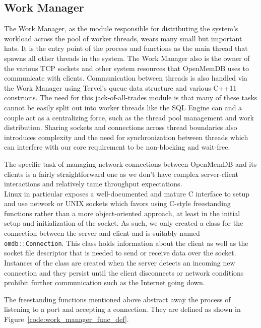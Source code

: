 \documentclass[letterpaper, 11pt]{article}
\newcommand{\inlinecode}[1]{\colorbox{codegrey}{\lstinline[language=C++]{#1}}}
\begin{document}
  \subsection{Work Manager}
  The Work Manager, as the module responsible for distributing the system's workload across the
  pool of worker threads, wears many small but important hats. It is the entry point of the
  process and functions as the main thread that spawns all other threads in the system. The Work
  Manager also is the owner of the various TCP sockets and other system resources that OpenMemDB
  uses to communicate with clients. Communication between threads is also handled via the
  Work Manager using Tervel's queue data structure and various C++11 constructs. The need for this
  jack-of-all-trades module is that many of these tasks cannot be easily split out into
  worker threads like the SQL Engine can and a couple act as a centralizing force, such as the
  thread pool management and work distribution. Sharing sockets and connections across thread
  boundaries also introduces complexity and the need for synchronization between threads which
  can interfere with our core requirement to be non-blocking and wait-free.
  \par\vspace{\baselineskip}
  The specific task of managing network connections between OpenMemDB and its clients is a fairly
  straightforward one as we don't have complex server-client interactions and relatively tame
  throughput expectations. \\ Linux in particular exposes a well-documented and mature C interface
  to setup and use network or UNIX sockets which favors using C-style freestanding functions
  rather than a more object-oriented approach, at least in the initial setup and initialization
  of the socket. As such, we only created a class for the connection between the server and client
  and is suitably named \inlinecode{omdb::Connection}. This class holds
  information about the client as well as the socket file descriptor that is needed to send
  or receive data over the socket. Instances of the class are created when the server detects an
  incoming new connection and they persist until the client disconnects or network conditions
  prohibit further communication such as the Internet going down.
  \par\vspace{\baselineskip}
  The freestanding functions mentioned above abstract away the process of listening to a port
  and accepting a connection. They are defined as shown in Figure~\ref{code:work_manager_func_def}.
\end{document}

